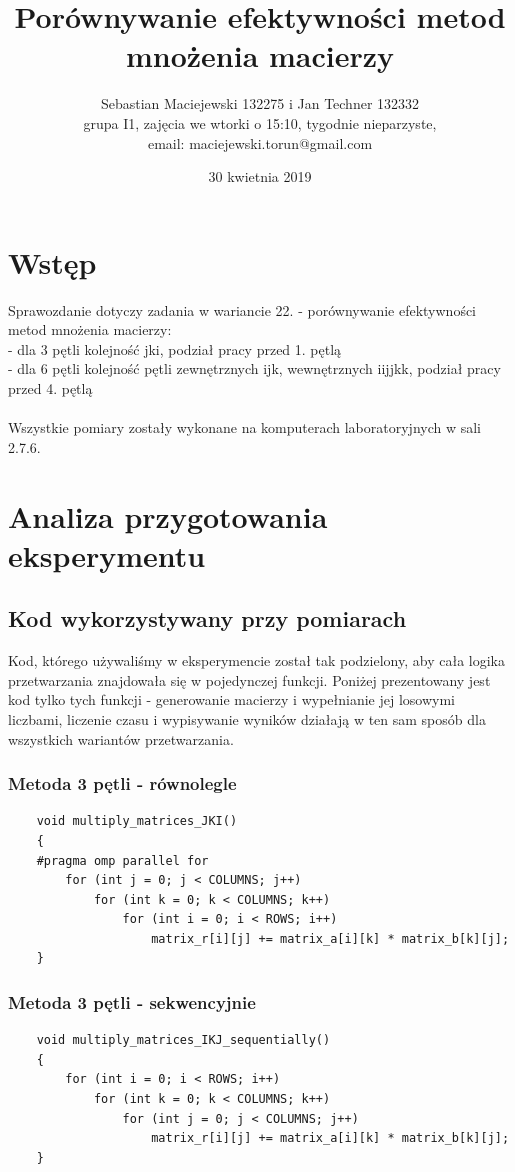 \documentclass[10pt,a4paper]{article}
\author{Sebastian Maciejewski 132275 i Jan Techner 132332\\
grupa I1, zajęcia we wtorki o 15:10, tygodnie nieparzyste,\\
email: maciejewski.torun@gmail.com}
\title{Porównywanie efektywności metod mnożenia macierzy}
\date{30 kwietnia 2019}
\begin{document}
\maketitle
\section{Wstęp}
Sprawozdanie dotyczy zadania w wariancie 22. - porównywanie efektywności metod
mnożenia macierzy:\\
- dla 3 pętli kolejność jki, podział pracy przed 1. pętlą\\
- dla 6 pętli kolejność pętli zewnętrznych ijk, wewnętrznych iijjkk,
podział pracy przed 4. pętlą\\
\\
Wszystkie pomiary zostały wykonane na komputerach laboratoryjnych w sali 2.7.6.
\section{Analiza przygotowania eksperymentu}
\subsection{Kod wykorzystywany przy pomiarach}
Kod, którego używaliśmy w eksperymencie został tak podzielony, aby cała
logika przetwarzania znajdowała się w pojedynczej funkcji. Poniżej prezentowany
jest kod tylko tych funkcji - generowanie macierzy i wypełnianie jej
losowymi liczbami, liczenie czasu i wypisywanie wyników działają w ten
sam sposób dla wszystkich wariantów przetwarzania.
\subsubsection{Metoda 3 pętli - równolegle}
\begin{lstlisting}
    void multiply_matrices_JKI()
    {
    #pragma omp parallel for 
        for (int j = 0; j < COLUMNS; j++)
            for (int k = 0; k < COLUMNS; k++)
                for (int i = 0; i < ROWS; i++)
                    matrix_r[i][j] += matrix_a[i][k] * matrix_b[k][j];
    }
\end{lstlisting}

\subsubsection{Metoda 3 pętli - sekwencyjnie}
\begin{lstlisting}
    void multiply_matrices_IKJ_sequentially() 
    {
        for (int i = 0; i < ROWS; i++)
            for (int k = 0; k < COLUMNS; k++)   
                for (int j = 0; j < COLUMNS; j++)
                    matrix_r[i][j] += matrix_a[i][k] * matrix_b[k][j];
    }
\end{lstlisting}
\end{document}

